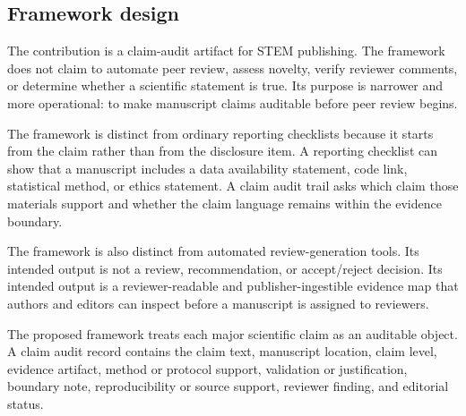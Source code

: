 \documentclass[12pt]{article}
\begin{document}
\subsection{Framework design}

The contribution is a claim-audit artifact for STEM publishing. The framework does not claim to automate peer review, assess novelty, verify reviewer comments, or determine whether a scientific statement is true. Its purpose is narrower and more operational: to make manuscript claims auditable before peer review begins.

The framework is distinct from ordinary reporting checklists because it starts from the claim rather than from the disclosure item. A reporting checklist can show that a manuscript includes a data availability statement, code link, statistical method, or ethics statement. A claim audit trail asks which claim those materials support and whether the claim language remains within the evidence boundary.

The framework is also distinct from automated review-generation tools. Its intended output is not a review, recommendation, or accept/reject decision. Its intended output is a reviewer-readable and publisher-ingestible evidence map that authors and editors can inspect before a manuscript is assigned to reviewers.

The proposed framework treats each major scientific claim as an auditable object. A claim audit record contains the claim text, manuscript location, claim level, evidence artifact, method or protocol support, validation or justification, boundary note, reproducibility or source support, reviewer finding, and editorial status.
\end{document}
